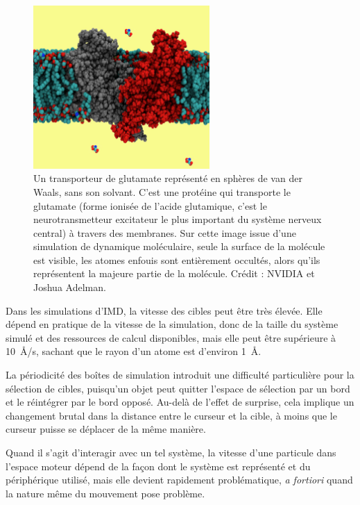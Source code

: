 	\begin{figure}[!htbp]
		\centering
		\includegraphics[width=0.6\textwidth]{figures/ch1/gluTrans}
		\caption[Transporteur de glutamate, très forte occultation]{Un transporteur de glutamate représenté en sphères de van der Waals, sans son solvant. C'est une protéine qui transporte le glutamate (forme ionisée de l'acide glutamique, c'est le neurotransmetteur excitateur le plus important du système nerveux central) à travers des membranes. Sur cette image issue d'une simulation de dynamique moléculaire, seule la surface de la molécule est visible, les atomes \og enfouis \fg{} sont entièrement occultés, alors qu'ils représentent la majeure partie de la molécule. Crédit : NVIDIA et Joshua Adelman\footnotemark.}
		\label{fig:gluTrans}
	\end{figure}
	
	
	Dans les simulations d'IMD, la vitesse des cibles peut être très élevée. Elle dépend en pratique de la vitesse de la simulation, donc de la taille du système simulé et des ressources de calcul disponibles, mais elle peut être supérieure à 10~\r{A}/s, sachant que le rayon d'un atome est d'environ 1~\r{A}.
	
	La périodicité des \og boîtes \fg{} de simulation introduit une difficulté particulière pour la sélection de cibles, puisqu'un objet peut quitter l'espace de sélection par un bord et le réintégrer par le bord opposé. Au-delà de l'effet de surprise, cela implique un changement brutal dans la distance entre le curseur et la cible, à moins que le curseur puisse se déplacer de la même manière.
	
	Quand il s'agit d'interagir avec un tel système, la vitesse d'une particule dans l'espace moteur dépend de la façon dont le système est représenté et du périphérique utilisé, mais elle devient rapidement problématique, \emph{a fortiori} quand la nature même du mouvement pose problème.
	
